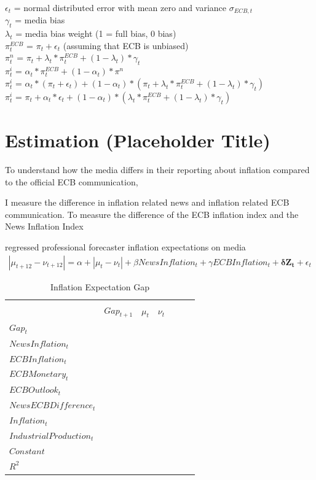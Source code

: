 \documentclass[review]{elsarticle}
\begin{document}
$\epsilon_t$ = normal distributed error with mean zero and variance $\sigma_{ECB,t}$ \\
$\gamma_t$ = media bias \\
$\lambda_t$ = media bias weight (1 = full bias, 0 bias) \\

$\pi^{ECB}_t$ = $\pi_t + \epsilon_t$ (assuming that ECB is unbiased) \\
$\pi^n_t$ = $\pi_t + \lambda_t * \pi^{ECB}_t + (1-\lambda_t) * \gamma_t$ \\

$\pi^i_t$ = $\alpha_t * \pi^{ECB}_t + (1-\alpha_t) * \pi^n$ \\
$\pi^i_t$ = $\alpha_t * (\pi_t + \epsilon_t) + (1-\alpha_t) * (\pi_t + \lambda_t * \pi^{ECB}_t + (1-\lambda_t) * \gamma_t)$ \\
$\pi^i_t$ = $\pi_t + \alpha_t * \epsilon_t + (1-\alpha_t) * (\lambda_t * \pi^{ECB}_t + (1-\lambda_t) * \gamma_t)$ \\

\section{Estimation (Placeholder Title)}\label{sec:Estimation}

To understand how the media differs in their reporting about inflation compared to the official ECB communication, 

I measure the difference in inflation related news and inflation related ECB communication. 
To measure the difference of the ECB inflation index and the News Inflation Index 

\cite{LamlaLein2014} regressed professional forecaster inflation expectations on media 
\begin{align}
|\mu_{t+12} - \nu_{t+12}| = \alpha + |\mu_t - \nu_t| + \beta NewsInflation_t + \gamma ECBInflation_t + \mathbf{\delta} \mathbf{Z_t} + \epsilon_t
\end{align}

\begin{table}
\centering 
  \caption{Inflation Expectation Gap} 
  \label{tab:Inflation Expectation Gap}
\begin{tabular}{lcccccc}   
\\[-1.8ex]\hline
\hline \\[-1.8ex] 
& $Gap_{t+1}$ & $\mu_t$ & $\nu_t$ & & &\\ 
$Gap_t$ & & & & & &\\
$NewsInflation_t$ & & & & & & \\
$ECBInflation_t$ & & & & & &\\
$ECBMonetary_t$ & & & & & &\\
$ECBOutlook_t$ & & & & & &\\
$News ECB Difference_t$ & & & & & &\\
$Inflation_t$ & & & & & &\\
$IndustrialProduction_t$ & & & & & &\\
$Constant$ & & & & & &\\
\midrule
	$R^2$ & & & & & &\\
\bottomrule
 \end{tabular} 
\end{table}
\end{document}
